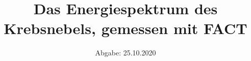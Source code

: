 

\subject{Lehrstuhlversuch im SS2020}
\title{Das Energiespektrum des Krebsnebels, gemessen mit FACT}
\date{%
  Abgabe: 25.10.2020
}


\maketitle
\thispagestyle{empty}
\tableofcontents
\newpage







%


